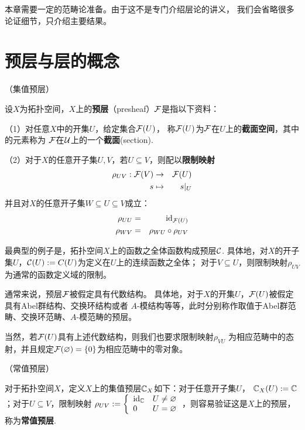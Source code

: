 {\color{blue}
本章需要一定的范畴论准备。由于这不是专门介绍层论的讲义，
我们会省略很多论证细节，只介绍主要结果。
}

\section{预层与层的概念}

\begin{definition}（集值预层）

设$X$为拓扑空间，$X$上的\textbf{预层}（presheaf）$\mathcal{F}$是指以下资料：

（1）对任意$X$中的开集$U$，给定集合$\mathcal{F}(U)$，
称$\mathcal{F}(U)$为$\mathcal{F}$在$U$上的\textbf{截面空间}，其中的元素称为
$\mathcal{F}$在$\mathcal{U}$上的一个\textbf{截面}(section).

（2）对于$X$的任意开子集$U,V$，若$U\subseteq V$，则配以\textbf{限制映射}
\begin{eqnarray*}
\rho_{UV}:\mathcal{F}(V)&\to&\mathcal{F}(U)\\
s&\mapsto&s|_U
\end{eqnarray*}
并且对$X$的任意开子集$W\subseteq U\subseteq V$成立：
\begin{eqnarray*}
\rho_{UU}&=&\operatorname{id}_{\mathcal{F}(U)} \\
\rho_{WV}&=&\rho_{WU}\circ\rho_{UV}
\end{eqnarray*}
\end{definition}

最典型的例子是，拓扑空间$X$上的函数之全体函数构成预层$\mathcal{C}$.
具体地，对$X$的开子集$U$，$\mathcal{C}(U):=C(U)$为定义在$U$上的连续函数之全体；
对于$V\subseteq U$，则限制映射$\rho_{UV}$为通常的函数定义域的限制。

\begin{rem}通常来说，预层$\mathcal{F}$被假定具有代数结构。
具体地，对于$X$的开集$U$，$\mathcal{F}(U)$被假定具有Abel群结构、交换环结构或者
$A$-模结构等等，此时分别称作取值于Abel群范畴、交换环范畴、$A$-模范畴的预层。
\end{rem}
当然，若$\mathcal{F}(U)$具有上述代数结构，则我们也要求限制映射$\rho_{VU}$
为相应范畴中的态射，并且规定$\mathcal{F}(\varnothing)=\{0\}$为相应范畴中的零对象。

\begin{example}（常值预层）
\label{常值预层-def}

对于拓扑空间$X$，定义$X$上的集值预层$\mathbb{C}_X$如下：对于任意开子集$U$，
$\mathbb{C}_X(U):=\mathbb{C}$；对于$U\subseteq V$，限制映射
$
  \rho_{UV}:=
  \left\{
    \begin{array}{ll}
      \operatorname{id}_{\mathbb{C}} & U\neq\varnothing\\
      0        & U=\varnothing
    \end{array}
  \right.
$，则容易验证这是$X$上的预层，称为\textbf{常值预层}.
\end{example}

